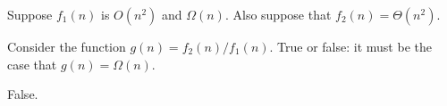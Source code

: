\begin{prob}
    Suppose $f_1(n)$ is  $O(n^2)$ and $\Omega(n)$. Also suppose that $f_2(n) = \Theta(n^2)$.

    Consider the function $g(n) = f_2(n) / f_1(n)$. True or false: it must be 
    the case that $g(n) = \Omega(n)$.
    \tF{}

    \begin{soln}
        False.
    \end{soln}
\end{prob}
